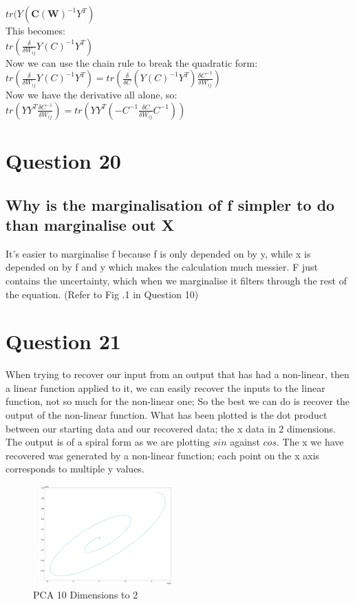 \documentclass[a4paper, 9pt]{article}
\begin{document}
\( tr(Y (\mathbf{C}(\mathbf{W})^{-1}Y^T) \) \\
\newline
This becomes: \\

\( tr(\frac{\delta}{\delta W_{ij}} Y(C)^{-1}Y^T) \) \\
\newline
Now we can use the chain rule to break the quadratic form: \\

\( tr(\frac{\delta}{\delta W_{ij}} Y(C)^{-1}Y^T) = tr(\frac{\delta}{\delta C} (Y(C)^{-1}Y^T) \frac{\delta C^{-1}}{\delta W_{ij}} ) \) \\
\newline
Now we have the derivative all alone, so: \\

\( tr(Y Y^T \frac{\delta C^{-1}}{\delta W_{ij}}) = tr(Y Y^T ( -C^{-1} \frac{\delta C}{\delta W_{ij}} C^{-1})) \)

\section*{Question 20}
\subsection*{Why is the marginalisation of f simpler to do than marginalise out X}
It's easier to marginalise f because f is only depended on by y, while x is depended on by f and y which makes the calculation much messier. F just contains the uncertainty, which when we marginalise it filters through the rest of the equation. (Refer to Fig .1 in Question 10)

\section*{Question 21}
When trying to recover our input from an output that has had a non-linear, then a linear function applied to it, we can easily recover the inputs to the linear function, not so much for the non-linear one; So the best we can do is recover the output of the non-linear function. What has been plotted is the dot product between our starting data and our recovered data; the x data in 2 dimensions.\\
The output is of a spiral form as we are plotting \(sin\) against \(cos\). The x we have recovered was generated by a non-linear function; each point on the x axis corresponds to multiple y values.
\begin{figure}[H]
\begin{center}
\includegraphics[width=2.2in,height=1.5in]{spiral}
\end{center}
\caption{PCA 10 Dimensions to 2}
\end{figure}
\end{document}
